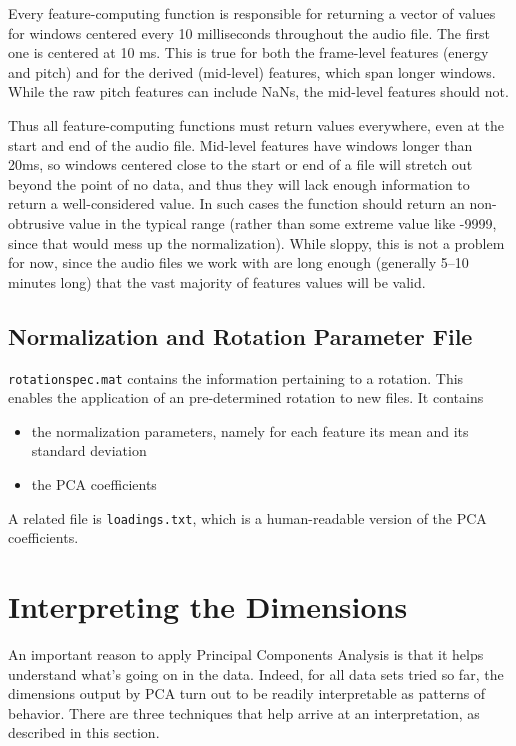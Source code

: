 \documentclass[11pt]{article}
\begin{document}
Every feature-computing function is responsible for returning a vector
of values for windows centered every 10 milliseconds throughout the
audio file.  The first one is centered at 10 ms.  This is true for
both the frame-level features (energy and pitch) and for the derived
(mid-level) features, which span longer windows.  While the raw pitch
features can include NaNs, the mid-level features should not.

Thus all feature-computing functions must return values everywhere,
even at the start and end of the audio file.  Mid-level features have
windows longer than 20ms, so windows centered close to the start or
end of a file will stretch out beyond the point of no data, and thus
they will lack enough information to return a well-considered value.
In such cases the function should return an non-obtrusive value in
the typical range (rather than some extreme value like -9999, since
that would mess up the normalization).  While sloppy, this is not a
problem for now, since the audio files we work with are long enough
(generally 5--10 minutes long) that the vast majority of features values
will be valid.


\subsection{Normalization and Rotation Parameter File}

{\tt rotationspec.mat}  contains the information pertaining to a
rotation.  This enables the application of an pre-determined rotation 
to new files.  It contains 

\begin{itemize}  \setlength{\itemsep}{0pt}\setlength{\parskip}{0pt}
\item the normalization parameters, namely for each feature its mean
  and its standard deviation

\item the PCA coefficients
\end{itemize}

A related file is {\tt loadings.txt}, which is a human-readable
version of the PCA coefficients.


\section{Interpreting the Dimensions}

An important reason to apply Principal Components Analysis is that it
helps understand what's going on in the data.  Indeed, for all data
sets tried so far, the dimensions output by PCA turn out to be readily
interpretable as patterns of behavior.  There are three techniques
that help arrive at an interpretation, as described in this section.
\end{document}
